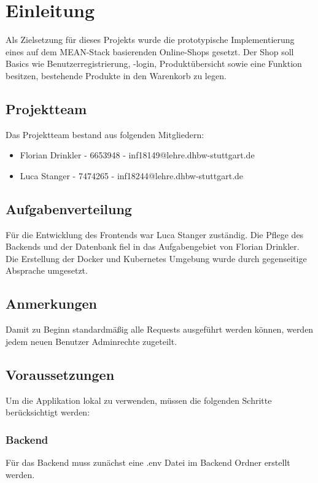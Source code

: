 
\chapter{Einleitung}\label{ch:einleitung}
Als Zielsetzung für dieses Projekts wurde die prototypische Implementierung eines auf dem MEAN-Stack basierenden Online-Shops gesetzt. Der Shop soll Basics wie Benutzerregistrierung, -login, Produktübersicht sowie eine Funktion besitzen, bestehende Produkte in den Warenkorb zu legen.
\section{Projektteam}\label{sec:projektteam}
Das Projektteam bestand aus folgenden Mitgliedern:
\begin{itemize}
	\item Florian Drinkler - 6653948 - inf18149@lehre.dhbw-stuttgart.de
	\item Luca Stanger - 7474265 - inf18244@lehre.dhbw-stuttgart.de
\end{itemize}
\section{Aufgabenverteilung}\label{sec:aufgabenverteilung}
Für die Entwicklung des Frontends war Luca Stanger zuständig. Die Pflege des Backends und der Datenbank fiel in das Aufgabengebiet von Florian Drinkler. Die Erstellung der Docker und Kubernetes Umgebung wurde durch gegenseitige Absprache umgesetzt.

\section{Anmerkungen}
Damit zu Beginn standardmäßig alle Requests ausgeführt werden können, werden jedem neuen Benutzer Adminrechte zugeteilt.

\newpage
\section{Voraussetzungen}
Um die Applikation lokal zu verwenden, müssen die folgenden Schritte berücksichtigt werden:

\subsection*{Backend}
Für das Backend muss zunächst eine .env Datei im Backend Ordner erstellt werden. 

